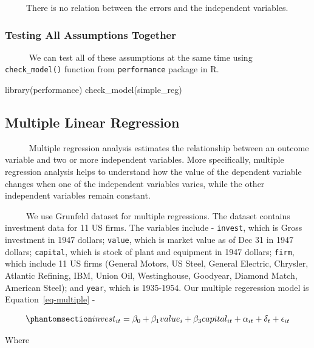 \documentclass[
  letterpaper,
  DIV=11,
  numbers=noendperiod]{scrreprt}
\newenvironment{Shaded}{\begin{snugshade}}{\end{snugshade}}
\newcommand{\FunctionTok}[1]{\textcolor[rgb]{0.28,0.35,0.67}{#1}}
\newcommand{\NormalTok}[1]{\textcolor[rgb]{0.00,0.23,0.31}{#1}}
\begin{document}
~~~~~There is no relation between the errors and the independent
variables.

\subsubsection{Testing All Assumptions
Together}\label{testing-all-assumptions-together}

~~~~~ We can test all of these assumptions at the same time using
\texttt{check\_model()} function from \texttt{performance} package in R.

\begin{Shaded}
\begin{Highlighting}[]
\FunctionTok{library}\NormalTok{(performance)}
\FunctionTok{check\_model}\NormalTok{(simple\_reg)}
\end{Highlighting}
\end{Shaded}

\subsection{Multiple Linear
Regression}\label{multiple-linear-regression}

~~~~~ Multiple regression analysis estimates the relationship between an
outcome variable and two or more independent variables. More
specifically, multiple regression analysis helps to understand how the
value of the dependent variable changes when one of the independent
variables varies, while the other independent variables remain constant.

~~~~~We use Grunfeld dataset for multiple regressions. The dataset
contains investment data for 11 US firms. The variables include -
\texttt{invest}, which is Gross investment in 1947 dollars;
\texttt{value}, which is market value as of Dec 31 in 1947 dollars;
\texttt{capital}, which is stock of plant and equipment in 1947 dollars;
\texttt{firm}, which include 11 US firms (General Motors, US Steel,
General Electric, Chrysler, Atlantic Refining, IBM, Union Oil,
Westinghouse, Goodyear, Diamond Match, American Steel); and
\texttt{year}, which is 1935-1954. Our multiple regeression model is
Equation~\ref{eq-multiple} -

\begin{equation}\protect\phantomsection\label{eq-multiple}{
invest_{it} = \beta_{0} + \beta_{1}value_{i} + \beta_{3}capital_{it} + \alpha_{it} + \delta_{t} + \epsilon_{it}
}\end{equation}

Where
\end{document}
